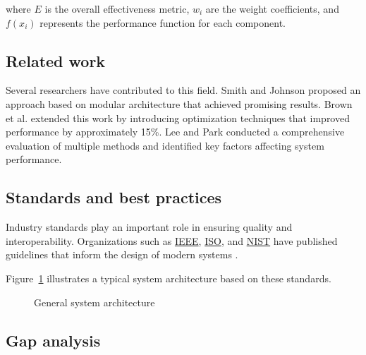 where $E$ is the overall effectiveness metric, $w_i$ are the weight coefficients, and $f(x_i)$ represents the performance function for each component.

\subsection{Related work}

Several researchers have contributed to this field.
Smith and Johnson \cite{sample-ref} proposed an approach based on modular architecture that achieved promising results.
Brown et al. \cite{sample-analysis} extended this work by introducing optimization techniques that improved performance by approximately 15\%.
Lee and Park \cite{sample-testing} conducted a comprehensive evaluation of multiple methods and identified key factors affecting system performance.

\subsection{Standards and best practices}

Industry standards play an important role in ensuring quality and interoperability.
Organizations such as \hyperlink{ieee}{IEEE}, \hyperlink{iso}{ISO}, and \hyperlink{nist}{NIST} have published guidelines that inform the design of modern systems \cite{nist-guide}.

Figure~\ref{fig:architecture} illustrates a typical system architecture based on these standards.

\begin{figure}[H]
    \centering
    \caption{General system architecture} \label{fig:architecture}
\end{figure}

\subsection{Gap analysis}

